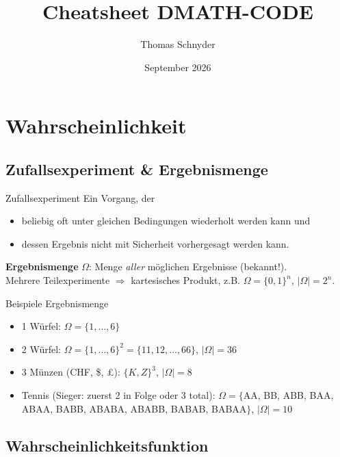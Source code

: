 \documentclass[a4paper, fontsize=7pt]{scrartcl}
\title{Cheatsheet DMATH-CODE}
\author{Thomas Schnyder}
\date{September 2026}
\begin{document}
\maketitle

\section{Wahrscheinlichkeit}

\subsection{Zufallsexperiment \& Ergebnismenge}

\begin{mainbox}{Zufallsexperiment}
Ein Vorgang, der
\begin{itemize}
    \item beliebig oft unter gleichen Bedingungen wiederholt werden kann und
    \item dessen Ergebnis nicht mit Sicherheit vorhergesagt werden kann.
\end{itemize}
\textbf{Ergebnismenge} $\Omega$: Menge \emph{aller} möglichen Ergebnisse
(bekannt!).\\
Mehrere Teilexperimente $\Rightarrow$ kartesisches Produkt, z.B.
$\Omega = \{0,1\}^n$, $|\Omega| = 2^n$.
\end{mainbox}

\begin{subbox}{Beispiele Ergebnismenge}
\begin{itemize}
    \item 1 Würfel: $\Omega = \{1,\ldots,6\}$
    \item 2 Würfel: $\Omega = \{1,\ldots,6\}^2 = \{11, 12, \ldots, 66\}$,
          $|\Omega| = 36$
    \item 3 Münzen (CHF, \$, £): $\{K,Z\}^3$, $|\Omega| = 8$
    \item Tennis (Sieger: zuerst 2 in Folge oder 3 total): $\Omega = \{$AA,
          BB, ABB, BAA, ABAA, BABB, ABABA, ABABB, BABAB, BABAA$\}$,
          $|\Omega| = 10$
\end{itemize}
\end{subbox}

\subsection{Wahrscheinlichkeitsfunktion}
\end{document}
